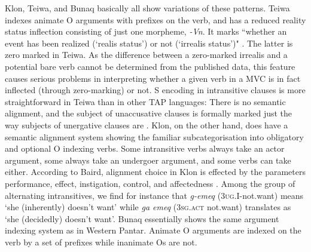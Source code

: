 Klon, Teiwa, and Bunaq basically all show variations of these patterns. Teiwa indexes animate O arguments with prefixes on the verb, and has a reduced reality status inflection consisting of just one morpheme, \textit{-Vn}. It marks ``whether an event has been realized (`realis status') or not (`irrealis status')" \citep[245]{klamer2010grammar}. The latter is zero marked in Teiwa. As the difference between a zero-marked irrealis and a potential bare verb cannot be determined from the published data, this feature causes serious problems in interpreting whether a given verb in a MVC is in fact inflected (through zero-marking) or not. S encoding in intransitive clauses is more straightforward in Teiwa than in other TAP languages: There is no semantic alignment, and the subject of unaccusative clauses is formally marked just the way subjects of unergative clauses are \citep[169]{klamer2010grammar}. Klon, on the other hand, does have a semantic alignment system showing the familiar subcategorisation into obligatory and optional O indexing verbs. Some intransitive verbs always take an actor argument, some always take an undergoer argument, and some verbs can take either. According to Baird, alignment choice in Klon is effected by the parameters performance, effect, instigation, control, and affectedness \citep[52]{baird2008grammar}. Among the group of alternating intransitives, we find for instance that \textit{g-emeq} (\textsc{3ug.I}-not.want) means `she (inherently) doesn't want' while \textit{ga emeq} (\textsc{3sg.act} not.want) translates as `she (decidedly) doesn't want'. Bunaq essentially shows the same argument indexing system as in Western Pantar. Animate O arguments are indexed on the verb by a set of prefixes while inanimate Os are not. 

